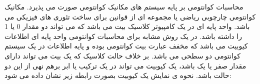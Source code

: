 \documentclass{article}
\begin{document}
محاسبات کوانتومی بر پایه سیستم های مکانیک  کوانتومی صورت می پذیرد. مکانیک کوانتومی چارچوبی ریاضی یا مجموعه ای از قوانین برای ساخت تئوری های فیزیکی می باشد.
واحد پایه ای در یک کامپیوتر کلاسیک بیت می باشد که می تواند دو مقدار 0 یا 1 را داشته باشد. در یک روش مشابه برای محاسبات کوانتومی واحد پایه ای اطلاعات کیوبیت می باشد که مخفف عبارت بیت کوانتومی بوده و پایه اطلاعات در یک سیستم کوانتومی دو سطحی می باشد. بر خلاف حالت کلاسیک که یک بیت می تواند دارای مقدار صفر یا یک باشد، یک کیوبیت می تواند در یک ترکیب یا ابر برهم نهی از این دو حالت باشد. نحوه ی نمایش یک کیوبیت بصورت رابطه زیر نشان داده می شود:
\end{document}
